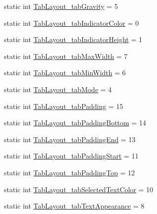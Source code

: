 \begin{DoxyCompactItemize}
\item 
static int \hyperlink{classandroid_1_1support_1_1v7_1_1cardview_1_1R_1_1styleable_a1a68091dcc77c9282baf3784559785fe}{Tab\+Layout\+\_\+tab\+Gravity} = 5
\item 
static int \hyperlink{classandroid_1_1support_1_1v7_1_1cardview_1_1R_1_1styleable_a5a446283d0134089aec8213efafa7b65}{Tab\+Layout\+\_\+tab\+Indicator\+Color} = 0
\item 
static int \hyperlink{classandroid_1_1support_1_1v7_1_1cardview_1_1R_1_1styleable_a1105a0d35da90cf70f0f89791a05d979}{Tab\+Layout\+\_\+tab\+Indicator\+Height} = 1
\item 
static int \hyperlink{classandroid_1_1support_1_1v7_1_1cardview_1_1R_1_1styleable_aad4a6769c12845096dbfe0535274c45c}{Tab\+Layout\+\_\+tab\+Max\+Width} = 7
\item 
static int \hyperlink{classandroid_1_1support_1_1v7_1_1cardview_1_1R_1_1styleable_a02d9b59abfd1ddbbe8c4d2e6062f03a5}{Tab\+Layout\+\_\+tab\+Min\+Width} = 6
\item 
static int \hyperlink{classandroid_1_1support_1_1v7_1_1cardview_1_1R_1_1styleable_aa12cc853d9a48dbe68c02155169f3221}{Tab\+Layout\+\_\+tab\+Mode} = 4
\item 
static int \hyperlink{classandroid_1_1support_1_1v7_1_1cardview_1_1R_1_1styleable_adb8179e42e0e5cad97cc015e8c4569c0}{Tab\+Layout\+\_\+tab\+Padding} = 15
\item 
static int \hyperlink{classandroid_1_1support_1_1v7_1_1cardview_1_1R_1_1styleable_ae40b7013d65d0b7702c09dc73558e5d1}{Tab\+Layout\+\_\+tab\+Padding\+Bottom} = 14
\item 
static int \hyperlink{classandroid_1_1support_1_1v7_1_1cardview_1_1R_1_1styleable_a1ad3770f59bb7fecbbaafe593ca05da6}{Tab\+Layout\+\_\+tab\+Padding\+End} = 13
\item 
static int \hyperlink{classandroid_1_1support_1_1v7_1_1cardview_1_1R_1_1styleable_ad6c26e7168880fb2f4068b1ae3d08955}{Tab\+Layout\+\_\+tab\+Padding\+Start} = 11
\item 
static int \hyperlink{classandroid_1_1support_1_1v7_1_1cardview_1_1R_1_1styleable_a0d0eb9efbce84535b45c5779754d6dd3}{Tab\+Layout\+\_\+tab\+Padding\+Top} = 12
\item 
static int \hyperlink{classandroid_1_1support_1_1v7_1_1cardview_1_1R_1_1styleable_abd3588bf878b74235a5268f7295f3b4f}{Tab\+Layout\+\_\+tab\+Selected\+Text\+Color} = 10
\item 
static int \hyperlink{classandroid_1_1support_1_1v7_1_1cardview_1_1R_1_1styleable_aac67299d9b8c00968768c8064795f58f}{Tab\+Layout\+\_\+tab\+Text\+Appearance} = 8

\end{DoxyCompactItemize}

